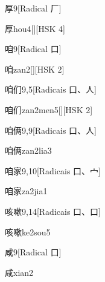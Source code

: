 \begin{entry}{厚}{9}[Radical ⼚]
  \begin{phonetics}{厚}{hou4}[][HSK 4]
  \end{phonetics}
\end{entry}

\begin{entry}{咱}{9}[Radical ⼝]
  \begin{phonetics}{咱}{zan2}[][HSK 2]
  \end{phonetics}
\end{entry}

\begin{entry}{咱们}{9,5}[Radicais ⼝、⼈]
  \begin{phonetics}{咱们}{zan2men5}[][HSK 2]
  \end{phonetics}
\end{entry}

\begin{entry}{咱俩}{9,9}[Radicais ⼝、⼈]
  \begin{phonetics}{咱俩}{zan2lia3}
  \end{phonetics}
\end{entry}

\begin{entry}{咱家}{9,10}[Radicais ⼝、⼧]
  \begin{phonetics}{咱家}{za2jia1}
  \end{phonetics}
\end{entry}

\begin{entry}{咳嗽}{9,14}[Radicais ⼝、⼝]
  \begin{phonetics}{咳嗽}{ke2sou5}
  \end{phonetics}
\end{entry}

\begin{entry}{咸}{9}[Radical ⼝]
  \begin{phonetics}{咸}{xian2}
  \end{phonetics}
\end{entry}

